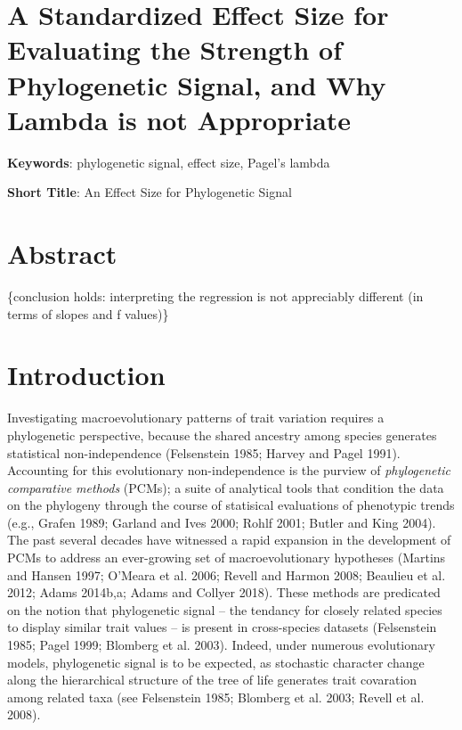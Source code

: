 \documentclass[
]{article}
\author{}
\date{\vspace{-2.5em}}
\begin{document}
\hypertarget{a-standardized-effect-size-for-evaluating-the-strength-of-phylogenetic-signal-and-why-lambda-is-not-appropriate}{%
\section{A Standardized Effect Size for Evaluating the Strength of
Phylogenetic Signal, and Why Lambda is not
Appropriate}\label{a-standardized-effect-size-for-evaluating-the-strength-of-phylogenetic-signal-and-why-lambda-is-not-appropriate}}

\hfill\break

\textbf{Keywords}: phylogenetic signal, effect size, Pagel's lambda
\hfill\break

\textbf{Short Title}: An Effect Size for Phylogenetic Signal
\hfill\break

\hypertarget{abstract}{%
\section{Abstract}\label{abstract}}

\{conclusion holds: interpreting the regression is not appreciably
different (in terms of slopes and f values)\}

\newpage

\hypertarget{introduction}{%
\section{Introduction}\label{introduction}}

Investigating macroevolutionary patterns of trait variation requires a
phylogenetic perspective, because the shared ancestry among species
generates statistical non-independence (Felsenstein 1985; Harvey and
Pagel 1991). Accounting for this evolutionary non-independence is the
purview of \emph{phylogenetic comparative methods} (PCMs); a suite of
analytical tools that condition the data on the phylogeny through the
course of statisical evaluations of phenotypic trends (e.g., Grafen
1989; Garland and Ives 2000; Rohlf 2001; Butler and King 2004). The past
several decades have witnessed a rapid expansion in the development of
PCMs to address an ever-growing set of macroevolutionary hypotheses
(Martins and Hansen 1997; O'Meara et al. 2006; Revell and Harmon 2008;
Beaulieu et al. 2012; Adams 2014b,a; Adams and Collyer 2018). These
methods are predicated on the notion that phylogenetic signal -- the
tendancy for closely related species to display similar trait values --
is present in cross-species datasets (Felsenstein 1985; Pagel 1999;
Blomberg et al. 2003). Indeed, under numerous evolutionary models,
phylogenetic signal is to be expected, as stochastic character change
along the hierarchical structure of the tree of life generates trait
covaration among related taxa (see Felsenstein 1985; Blomberg et al.
2003; Revell et al. 2008). \hfill\break
\end{document}
